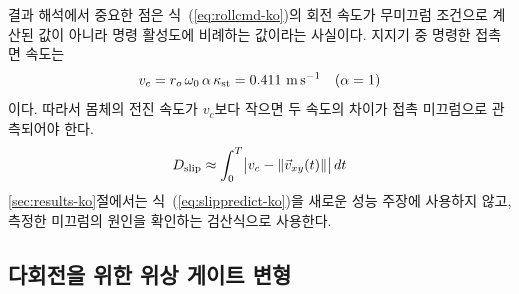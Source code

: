 결과 해석에서 중요한 점은 식~(\ref{eq:rollcmd-ko})의 회전 속도가 무미끄럼
조건으로 계산된 값이 아니라 명령 활성도에 비례하는 값이라는 사실이다. 지지기
중 명령한 접촉면 속도는
\begin{equation}
 v_c=r_o\,\omega_0\,\alpha\,\kappa_{\rm st}
   =0.411\ \mathrm{m\,s^{-1}}\quad(\alpha=1)                    \label{eq:contactspeed-ko}
\end{equation}
이다. 따라서 몸체의 전진 속도가 $v_c$보다 작으면 두 속도의 차이가 접촉
미끄럼으로 관측되어야 한다.
\begin{equation}
 D_{\rm slip}\approx\int_0^T\bigl|v_c-\|\vec{v}_{xy}(t)\|\bigr|\,dt
                                                               \label{eq:slippredict-ko}
\end{equation}
\ref{sec:results-ko}절에서는 식~(\ref{eq:slippredict-ko})을 새로운 성능 주장에
사용하지 않고, 측정한 미끄럼의 원인을 확인하는 검산식으로 사용한다.

\iffalse
\subsection{다회전을 위한 위상 게이트 변형}\label{sub:gate-ko}


